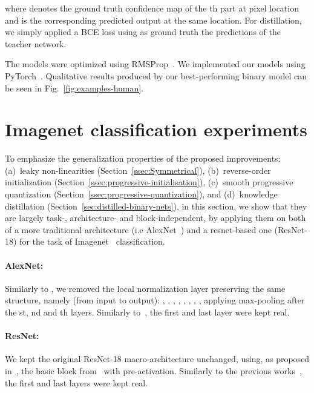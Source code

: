 \documentclass[10pt,twocolumn,letterpaper]{article}
\begin{document}
where  denotes the ground truth confidence map of the th part at pixel location  and  is the corresponding predicted output at the same location. For distillation, we simply applied a BCE loss using as ground truth the predictions of the teacher network. 

The models were optimized using RMSProp~\cite{tieleman2012lecture}. We implemented our models using PyTorch~\cite{paszke2017automatic}. Qualitative results produced by our best-performing binary model can be seen in Fig.~\ref{fig:examples-human}.

\section{Imagenet classification experiments}\label{sec:results-imagenet}

To emphasize the generalization properties of the proposed improvements: (a)~leaky non-linearities (Section~\ref{ssec:Symmetrical}), (b)~reverse-order initialization (Section~\ref{ssec:progressive-initialisation}), (c)~smooth progressive quantization (Section~\ref{ssec:progressive-quantization}), and (d)~knowledge distillation (Section~\ref{sec:distilled-binary-nets}), in this section, we show that they are largely task-, architecture- and block-independent, by applying them on both of a more traditional architecture (i.e AlexNet~\cite{krizhevsky2012imagenet}) and a resnet-based one (ResNet-18) for the task of  Imagenet~\cite{deng2009imagenet} classification.

\paragraph{AlexNet:} Similarly to \cite{rastegari2016xnor, courbariaux2016binarized}, we removed the local normalization layer preserving the same structure, namely (from input to output): , , , , , , , , applying max-pooling after the st, nd and th layers. Similarly to~\cite{rastegari2016xnor}, the first and last layer were kept real.

\paragraph{ResNet:} We kept the original ResNet-18 macro-architecture unchanged, using, as proposed in~\cite{rastegari2016xnor}, the basic block from~\cite{he2016identity} with pre-activation. Similarly to the previous works~\cite{rastegari2016xnor}, the first and last layers were kept real.
\end{document}
